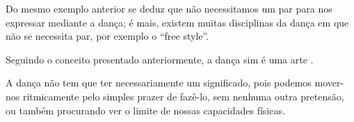 Do mesmo exemplo anterior se deduz que não necessitamos um par para nos expressar mediante a dança;
é mais, existem muitas disciplinas da dança em que não se necessita par,
por exemplo o ``free style''.

Seguindo o conceito presentado anteriormente, a dança sim é uma arte \cite[pp. 17]{bencardinidanca}.

A dança não tem que ter necessariamente um significado, 
pois podemos mover-nos ritmicamente pelo simples prazer de fazê-lo, 
sem nenhuma outra pretensão, 
ou também procurando ver o limite de nossas capacidades físicas.





